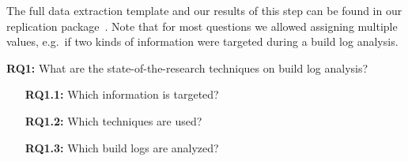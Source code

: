 The full data extraction template and our results of this step can be
found in our replication package~\cite{brandt2020chunk-replication}.
Note that for most questions we allowed assigning multiple values,
e.g.\ if
two kinds of information were targeted during a build log analysis.

\begin{simplebox}[attach boxed title to top center={yshift=-6mm}]
{\textbf{RQ1:} What are the state-of-the-research
techniques on build log analysis?}
\begin{itemize}[leftmargin=2cm]
  \item[\textbf{RQ1.1:}] Which information is targeted?
  \item[\textbf{RQ1.2:}] Which techniques are used?
  \item[\textbf{RQ1.3:}] Which build logs are analyzed?
\end{itemize}
\end{simplebox}

